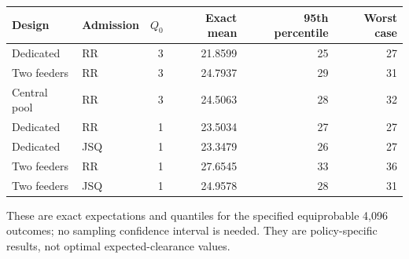 \begin{center}\small
\begin{tabular}{llrrrr}
\toprule
Design & Admission & $Q_0$ & Exact mean & 95th percentile & Worst case\\\midrule
Dedicated & RR & 3 & 21.8599 & 25 & 27 \\
Two feeders & RR & 3 & 24.7937 & 29 & 31 \\
Central pool & RR & 3 & 24.5063 & 28 & 32 \\
Dedicated & RR & 1 & 23.5034 & 27 & 27 \\
Dedicated & JSQ & 1 & 23.3479 & 26 & 27 \\
Two feeders & RR & 1 & 27.6545 & 33 & 36 \\
Two feeders & JSQ & 1 & 24.9578 & 28 & 31 \\
\bottomrule
\end{tabular}
\end{center}
These are exact expectations and quantiles for the specified equiprobable 4,096 outcomes; no sampling confidence interval is needed. They are policy-specific results, not optimal expected-clearance values.